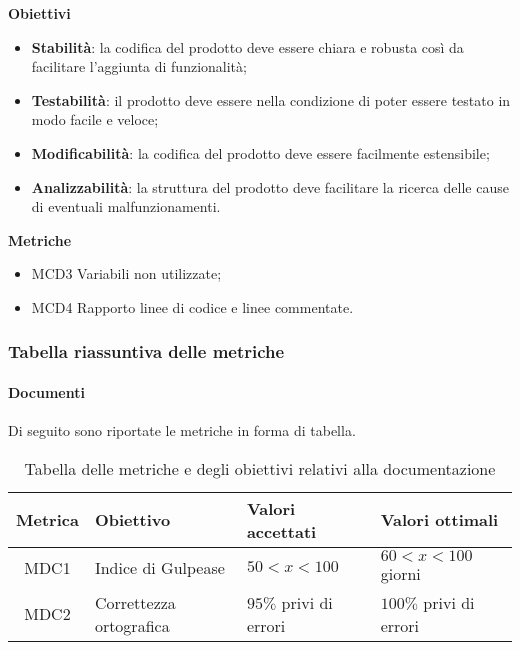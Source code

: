 \textbf{Obiettivi}
\begin{itemize}
\item \textbf{Stabilità}: la codifica del prodotto deve essere chiara e robusta così da facilitare l'aggiunta di funzionalità;
\item \textbf{Testabilità}: il prodotto deve essere nella condizione di poter essere testato in modo facile e veloce;
\item \textbf{Modificabilità}: la codifica del prodotto deve essere facilmente estensibile;
\item \textbf{Analizzabilità}: la struttura del prodotto deve facilitare la ricerca delle cause di eventuali malfunzionamenti.
\end{itemize}

\textbf{Metriche}
\begin{itemize}
\item MCD3 Variabili non utilizzate;
\item MCD4 Rapporto linee di codice e linee commentate.
\end{itemize}

\subsubsection{Tabella riassuntiva delle metriche}
\paragraph{Documenti}
Di seguito sono riportate le metriche in forma di tabella.
\begin{table}[H]
		\begin{center}
			\setlength{\aboverulesep}{0pt}
			\setlength{\belowrulesep}{0pt}
			\setlength{\extrarowheight}{.75ex}
			\begin{tabular}{ c C{6cm} C{3cm} C{3cm} }
				\textbf{Metrica} & \textbf{Obiettivo} & \textbf{Valori accettati} & \textbf{Valori ottimali}  \\
				\toprule
				MDC1 & Indice di Gulpease & $ 50 < x < 100$ & $60 < x < 100$ giorni \\
				MDC2 & Correttezza ortografica & $ 95 \%$ privi di errori & $ 100\%$ privi di errori \\
				\bottomrule
			\end{tabular}
			\caption{Tabella delle metriche e degli obiettivi relativi alla documentazione}
		\end{center}
	\end{table}
	
